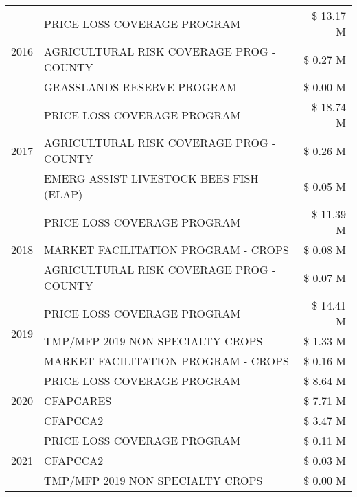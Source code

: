 \begin{tabular}{llr}
\cline{1-3}
\multirow[t]{3}{*}{2016} & PRICE LOSS COVERAGE PROGRAM & \$ 13.17 M \\
 & AGRICULTURAL RISK COVERAGE PROG - COUNTY & \$ 0.27 M \\
 & GRASSLANDS RESERVE PROGRAM & \$ 0.00 M \\
\cline{1-3}
\multirow[t]{3}{*}{2017} & PRICE LOSS COVERAGE PROGRAM & \$ 18.74 M \\
 & AGRICULTURAL RISK COVERAGE PROG - COUNTY & \$ 0.26 M \\
 & EMERG ASSIST LIVESTOCK BEES FISH (ELAP) & \$ 0.05 M \\
\cline{1-3}
\multirow[t]{3}{*}{2018} & PRICE LOSS COVERAGE PROGRAM & \$ 11.39 M \\
 & MARKET FACILITATION PROGRAM - CROPS & \$ 0.08 M \\
 & AGRICULTURAL RISK COVERAGE PROG - COUNTY & \$ 0.07 M \\
\cline{1-3}
\multirow[t]{3}{*}{2019} & PRICE LOSS COVERAGE PROGRAM & \$ 14.41 M \\
 & TMP/MFP 2019 NON SPECIALTY CROPS & \$ 1.33 M \\
 & MARKET FACILITATION PROGRAM - CROPS & \$ 0.16 M \\
\cline{1-3}
\multirow[t]{3}{*}{2020} & PRICE LOSS COVERAGE PROGRAM & \$ 8.64 M \\
 & CFAPCARES & \$ 7.71 M \\
 & CFAPCCA2 & \$ 3.47 M \\
\cline{1-3}
\multirow[t]{3}{*}{2021} & PRICE LOSS COVERAGE PROGRAM & \$ 0.11 M \\
 & CFAPCCA2 & \$ 0.03 M \\
 & TMP/MFP 2019 NON SPECIALTY CROPS & \$ 0.00 M \\
\cline{1-3}
\bottomrule
\end{tabular}
